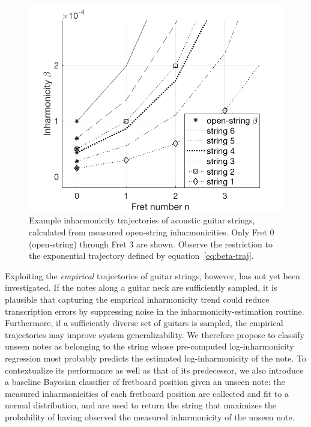 \documentclass[convention,peer-reviewed]{aesconf}
\begin{document}
\begin{figure}[h] 
\centering
\includegraphics[scale=0.25]{figs/beta-trajectories-ag}
\caption{Example inharmonicity trajectories of acoustic guitar strings, calculated from measured open-string inharmonicities. Only Fret 0 (open-string) through Fret 3 are shown. Observe the restriction to the exponential trajectory defined by equation~\eqref{eq:beta-traj}.}
\label{fig:beta-trajectories-ag}
\end{figure}

Exploiting the \textit{empirical} trajectories of guitar strings, however, has not yet been investigated. If the notes along a guitar neck are sufficiently sampled, it is plausible that capturing the empirical inharmonicity trend could reduce transcription errors by suppressing noise in the inharmonicity-estimation routine. Furthermore, if a sufficiently diverse set of guitars is sampled, the empirical trajectories may improve system generalizability. We therefore propose to classify unseen notes as belonging to the string whose pre-computed log-inharmonicity regression most probably predicts the estimated log-inharmonicity of the note. To contextualize its performance as well as that of its predecessor, we also introduce a baseline Bayesian classifier of fretboard position given an unseen note: the measured inharmonicities of each fretboard position are collected and fit to a normal distribution, and are used to return the string that maximizes the probability of having observed the measured inharmonicity of the unseen note.
\end{document}
